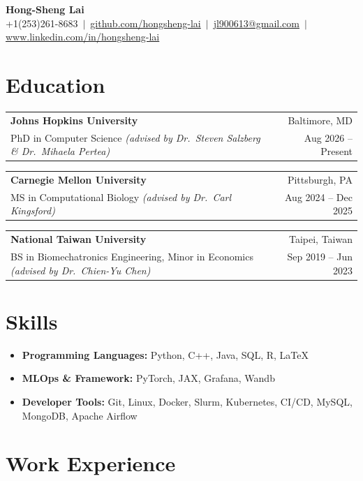 \documentclass[letterpaper,11pt]{article}
\makeatletter
\newcommand{\entry}[4]{%
  \begin{tabular*}{\textwidth}{@{}l@{\extracolsep{\fill}}r@{}}
    \textbf{#1} & #2 \\
    #3 & #4 \\
  \end{tabular*}
}
\makeatother
\begin{document}
\begin{center}
  {\LARGE\bfseries Hong-Sheng Lai}\\[2pt]
  +1(253)261-8683 \,$|$\,
  \href{https://github.com/hongsheng-lai}{github.com/hongsheng-lai} \,$|$\,
  \href{mailto:jl900613@gmail.com}{jl900613@gmail.com} \,$|$\,
  \href{https://www.linkedin.com/in/hongsheng-lai}{www.linkedin.com/in/hongsheng-lai}
\end{center}

\section{Education}

\entry
  {Johns Hopkins University}{Baltimore, MD}
  {PhD in Computer Science \textit{(advised by Dr.\ Steven Salzberg \& Dr.\ Mihaela Pertea)}}{Aug 2026 -- Present}
\entry
  {Carnegie Mellon University}{Pittsburgh, PA}
  {MS in Computational Biology \textit{(advised by Dr.\ Carl Kingsford)}}{Aug 2024 -- Dec 2025}
\entry
  {National Taiwan University}{Taipei, Taiwan}
  {BS in Biomechatronics Engineering, Minor in Economics \textit{(advised by Dr.\ Chien-Yu Chen)}}{Sep 2019 -- Jun 2023}

\section{Skills}
\begin{itemize}
  \item \textbf{Programming Languages:} Python, C++, Java, SQL, R, LaTeX
  \item \textbf{MLOps \& Framework:} PyTorch, JAX, Grafana, Wandb
  \item \textbf{Developer Tools:} Git, Linux, Docker, Slurm, Kubernetes, CI/CD, MySQL, MongoDB, Apache Airflow
\end{itemize}

\section{Work Experience}
\end{document}
